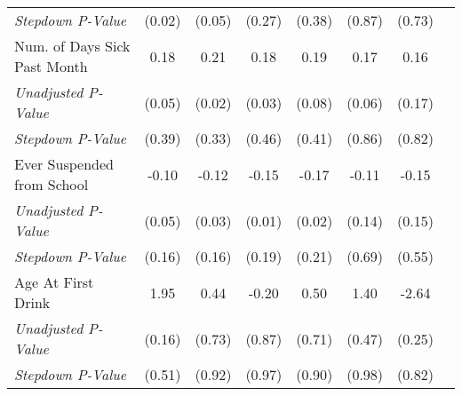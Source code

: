 \begin{tabular}{l c c c c c c c}
\quad \textit{Stepdown P-Value} & (0.02) & (0.05) & (0.27) & (0.38) & (0.87) & (0.73) \\
Num. of Days Sick Past Month & 0.18 & 0.21 & 0.18 & 0.19 & 0.17 & 0.16 \\
\quad \textit{Unadjusted P-Value} & (0.05) & (0.02) & (0.03) & (0.08) & (0.06) & (0.17) \\
\quad \textit{Stepdown P-Value} & (0.39) & (0.33) & (0.46) & (0.41) & (0.86) & (0.82) \\
Ever Suspended from School & -0.10 & -0.12 & -0.15 & -0.17 & -0.11 & -0.15 \\
\quad \textit{Unadjusted P-Value} & (0.05) & (0.03) & (0.01) & (0.02) & (0.14) & (0.15) \\
\quad \textit{Stepdown P-Value} & (0.16) & (0.16) & (0.19) & (0.21) & (0.69) & (0.55) \\
Age At First Drink & 1.95 & 0.44 & -0.20 & 0.50 & 1.40 & -2.64 \\
\quad \textit{Unadjusted P-Value} & (0.16) & (0.73) & (0.87) & (0.71) & (0.47) & (0.25) \\
\quad \textit{Stepdown P-Value} & (0.51) & (0.92) & (0.97) & (0.90) & (0.98) & (0.82) \\
\bottomrule
\end{tabular}
